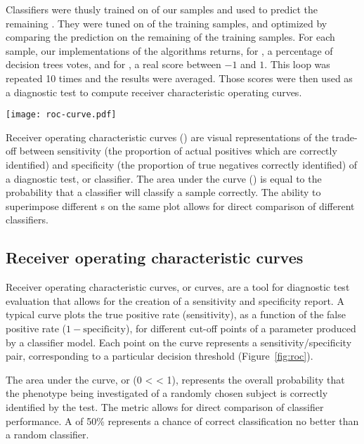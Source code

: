 Classifiers were thusly trained on  of our samples and used to
predict the remaining .  They were tuned on  of the
training samples, and optimized by comparing the prediction on the remaining
 of the training samples.  For each sample, our implementations of
the algorithms returns, for , a percentage of decision trees
votes, and for , a real score between $-1$ and $1$.  This loop
was repeated 10 times and the results were averaged.  Those scores were then
used as a diagnostic test to compute receiver characteristic operating curves.

\begin{marginfigure}%
    \texttt{[image: roc-curve.pdf]}
    \caption[Example of a receiver operating characteristic (
    curve)]{Receiver operating characteristic curves () are
      visual representations of the trade-off between sensitivity (the
      proportion of actual positives which are correctly identified) and
      specificity (the proportion of true negatives correctly identified) of a
      diagnostic test, or classifier.  The area under the  curve
      () is equal to the probability that a classifier will
      classify a sample correctly.  The ability to superimpose different
      s on the same plot allows for direct comparison of
      different classifiers.}
    \label{fig:roc}%
\end{marginfigure}

\subsection{Receiver operating characteristic curves}
\label{sec:methods-roc}

Receiver operating characteristic curves, or  curves, are a tool
for diagnostic test evaluation that allows for the creation of a sensitivity and
specificity report.\cite{fawcett_introduction_2006} A typical 
curve plots the true positive rate (sensitivity), as a function of the false
positive rate ($1-\text{specificity}$), for different cut-off points of a
parameter produced by a classifier model.  Each point on the
 curve represents a sensitivity/specificity pair, corresponding
to a particular decision threshold (Figure~\ref{fig:roc}).

The area under the curve, or  (0 <  < 1),
represents the overall probability that the phenotype being investigated of a
randomly chosen subject is correctly identified by the
test.\cite{hanley_meaning_1982}  The  metric allows for direct
comparison of classifier performance.  A  of 50\% represents a
chance of correct classification no better than a random classifier.

